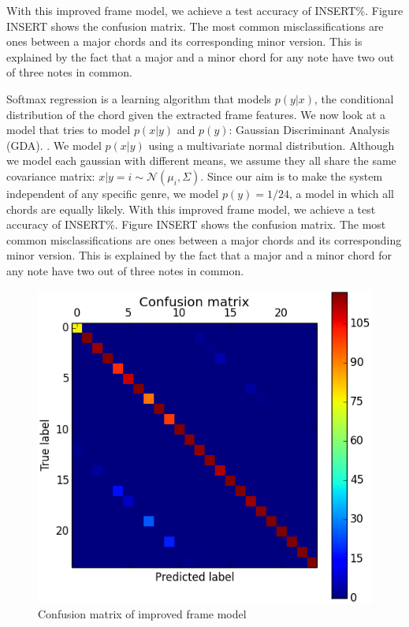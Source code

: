 \documentclass{article}
\begin{document}
With this improved frame model, we achieve a test accuracy of INSERT\%. Figure INSERT shows the confusion matrix. The most common misclassifications are ones between a major chords and its corresponding minor version. This is explained by the fact that a major and a minor chord for any note have two out of three notes in common. 

Softmax regression is a learning algorithm that models $p(y|x)$, the conditional distribution of the chord given the extracted frame features. We now look at a model that tries to model $p(x|y)$ and $p(y)$: Gaussian Discriminant Analysis (GDA). \cite{jiang}. We model $p(x|y)$ using a multivariate normal distribution. Although we model each gaussian with different means, we assume they all share the same covariance matrix: $x|y=i \sim \mathcal{N}$$(\mu_i, \Sigma)$. Since our aim is to make the system independent of any specific genre, we model $p(y) = 1/24$, a model in which all chords are equally likely. With this improved frame model, we achieve a test accuracy of INSERT\%. Figure INSERT shows the confusion matrix. The most common misclassifications are ones between a major chords and its corresponding minor version. This is explained by the fact that a major and a minor chord for any note have two out of three notes in common. 

\begin{figure}[ht]
\vskip 0.2in
\begin{center}
\centerline{\includegraphics[width=\columnwidth]{conf}}
\caption{Confusion matrix of improved frame model}
\label{icml-historical}
\end{center}
\vskip -0.2in
\end{figure}
\end{document}
